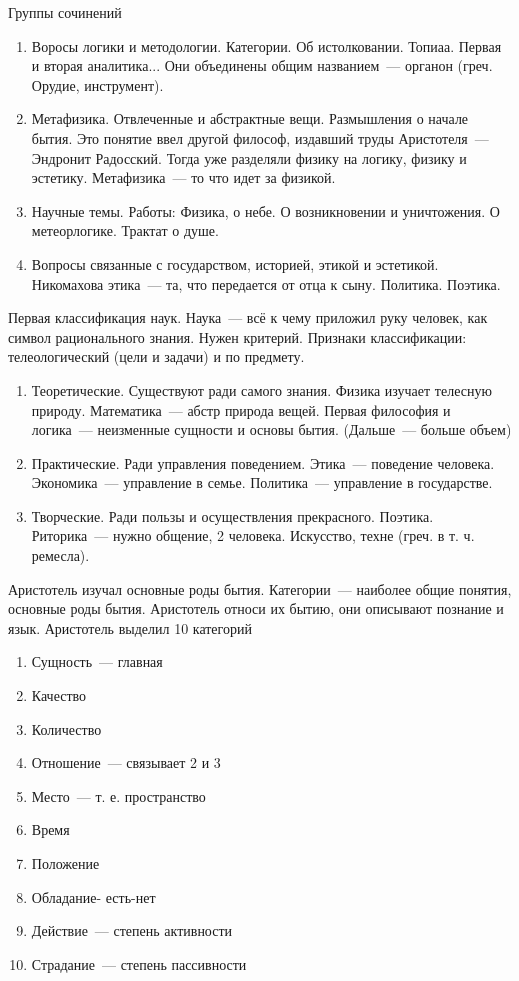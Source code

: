 
Группы сочинений

\begin{enumerate}
	\item Воросы логики и методологии. Категории. Об истолковании. Топиаа. Первая и вторая аналитика... Они объединены общим названием~--- органон (греч. Орудие, инструмент). 
	\item Метафизика. Отвлеченные и абстрактные вещи. Размышления о начале бытия. Это понятие ввел другой философ, издавший труды Аристотеля~--- Эндронит Радосский. Тогда уже разделяли физику на логику, физику и эстетику. Метафизика~--- то что идет за физикой. 
	\item Научные темы. Работы: Физика, о небе. О возникновении и уничтожения. О метеорлогике. Трактат о душе. 
	\item Вопросы связанные с государством, историей, этикой и эстетикой. Никомахова этика~--- та, что передается от отца к сыну. Политика. Поэтика. 
\end{enumerate}

Первая классификация наук. Наука~--- всё к чему приложил руку человек, как символ рационального знания. Нужен критерий. Признаки классификации: телеологический (цели и задачи) и по предмету. 

	
\begin{enumerate}
	\item Теоретические. Существуют ради самого знания. Физика изучает телесную природу. Математика~--- абстр природа вещей. Первая философия и логика~--- неизменные сущности и основы бытия. (Дальше~--- больше объем) 
	\item Практические. Ради управления поведением. Этика~--- поведение человека. Экономика~--- управление в семье. Политика~--- управление в государстве. 
	\item Творческие. Ради пользы и осуществления прекрасного. Поэтика. Риторика~--- нужно общение, 2 человека. Искусство, техне (греч. в т. ч. ремесла). 
\end{enumerate}

Аристотель изучал основные роды бытия. Категории~--- наиболее общие понятия, основные роды бытия. Аристотель относи их бытию, они описывают познание и язык. 
Аристотель выделил 10 категорий

\begin{enumerate}
	\item Сущность~--- главная
	\item Качество
	\item Количество
	\item Отношение~--- связывает 2 и 3
	\item Место~--- т. е. пространство
	\item Время
	\item Положение
	\item Обладание- есть-нет
	\item Действие~--- степень активности
	\item Страдание~--- степень пассивности
\end{enumerate}

